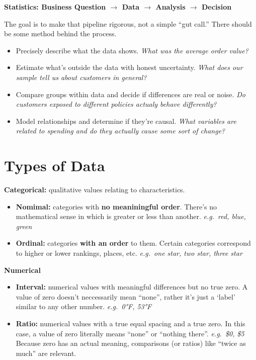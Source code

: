 \documentclass[
  letterpaper,
  DIV=11,
  numbers=noendperiod]{scrreprt}
\newcounter{none} %
\providecommand{\tightlist}{%
  \setlength{\itemsep}{0pt}\setlength{\parskip}{0pt}}
\begin{document}
\textbf{Statistics: Business Question \(\rightarrow\) Data
\(\rightarrow\) Analysis \(\rightarrow\) Decision}

The goal is to make that pipeline rigorous, not a simple ``gut call.''
There should be some method behind the process.

\begin{itemize}
\tightlist
\item
  Precisely describe what the data shows. \emph{What was the average
  order value?}
\item
  Estimate what's outside the data with honest uncertainty. \emph{What
  does our sample tell us about customers in general?}
\item
  Compare groups within data and decide if differences are real or
  noise. \emph{Do customers exposed to different policies actualy behave
  differently?}
\item
  Model relationships and determine if they're causal. \emph{What
  variables are related to spending and do they actually cause some sort
  of change?}
\end{itemize}

\section{Types of Data}\label{types-of-data}

\textbf{Categorical:} qualitative values relating to characteristics.

\begin{itemize}
\tightlist
\item
  \textbf{Nomimal:} categories with \textbf{no meaniningful order}.
  There's no mathematical sense in which is greater or less than
  another. \emph{e.g.~red, blue, green}
\item
  \textbf{Ordinal:} categories \textbf{with an order} to them. Certain
  categories correspond to higher or lower rankings, places, etc.
  \emph{e.g.~one star, two star, three star}
\end{itemize}

\textbf{Numerical}

\begin{itemize}
\tightlist
\item
  \textbf{Interval:} numerical values with meaningful differences but no
  true zero. A value of zero doesn't neccessarily mean ``none'', rather
  it's just a `label' similar to any other number. \emph{e.g.~0°F, 53°F}
\item
  \textbf{Ratio:} numerical values with a true equal spacing and a true
  zero. In this case, a value of zero literally means ``none'' or
  ``nothing there''. \emph{e.g.~\$0, \$5} Because zero has an actual
  meaning, comparisons (or ratios) like ``twice as much'' are relevant.
\end{itemize}
\end{document}
